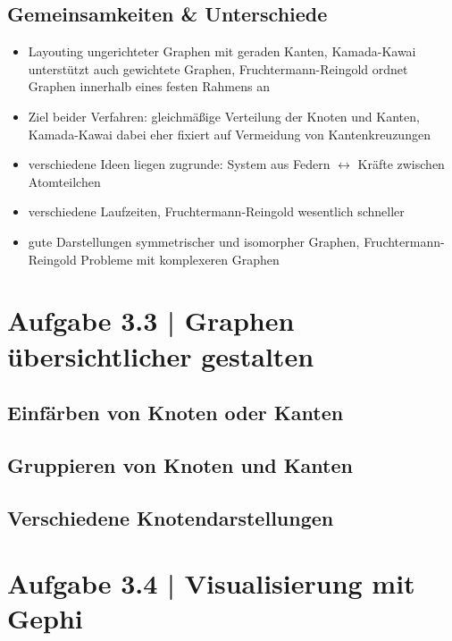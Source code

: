 \documentclass[a4paper,12pt,ngerman]{scrartcl}
\begin{document}
\subsection*{Gemeinsamkeiten \& Unterschiede}
\begin{itemize}
\item Layouting ungerichteter Graphen mit geraden Kanten, Kamada-Kawai unterstützt auch gewichtete Graphen, Fruchtermann-Reingold ordnet Graphen innerhalb eines festen Rahmens an
\item Ziel beider Verfahren: gleichmäßige Verteilung der Knoten und Kanten, Kamada-Kawai dabei eher fixiert auf Vermeidung von Kantenkreuzungen
\item verschiedene Ideen liegen zugrunde: System aus Federn $\leftrightarrow$ Kräfte zwischen Atomteilchen
\item verschiedene Laufzeiten, Fruchtermann-Reingold wesentlich schneller
\item gute Darstellungen symmetrischer und isomorpher Graphen, Fruchtermann-Reingold Probleme mit komplexeren Graphen
\end{itemize}

\section{Aufgabe 3.3 | Graphen übersichtlicher gestalten}

\subsection*{Einfärben von Knoten oder Kanten}
\subsection*{Gruppieren von Knoten und Kanten}
\subsection*{Verschiedene Knotendarstellungen}

\section{Aufgabe 3.4 | Visualisierung mit Gephi}

%
\end{document}
